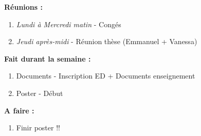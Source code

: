 \textbf{Réunions :}
\begin{enumerate}[label=\textbullet]
	\item \textit{Lundi à Mercredi matin} - Congés
	\item \textit{Jeudi après-midi} - Réunion thèse (Emmanuel + Vanessa)
\end{enumerate}
\textbf{Fait durant la semaine :}
\begin{enumerate}[label=\textbullet]
	\item Documents - Inscription ED + Documents enseignement
	\item Poster - Début
\end{enumerate}
\textbf{A faire :}
\begin{enumerate}[label=\textbullet]
	\item Finir poster !!
\end{enumerate}